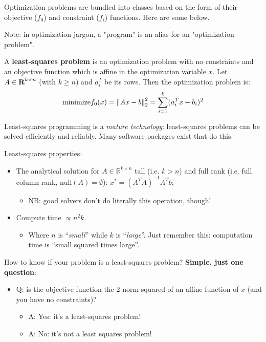 Optimization problems are bundled into classes based on the form of their
objective ($f_0$) and constraint ($f_i$) functions. Here are some below.

\begin{Fact}
  Note: in optimization jargon, a "program" is an alias for an "optimization
  problem".
\end{Fact}


\begin{Definition}
  A \textbf{least-squares problem} is an optimization problem with no
  constraints and an objective function which is affine in the optimization
  variable $x$. Let $A\in\textbf{R}^{k\times n}$ (with $k\ge n$) and $a_i^T$ be its
  rows. Then the optimization problem is:
  \begin{equation*}
    \text{minimize} f_0(x) = \left\|Ax-b\right\|_{2}^2 = \sum_{i=1}^k (a_i^Tx-b_i)^2
  \end{equation*}
\end{Definition}

Least-squares programming is a \textit{mature technology}: least-squares
problems can be solved efficiently and reliably. Many software packages exist
that do this.

\begin{Fact}
  Least-squares properties:
  \begin{itemize}
  \item The analytical solution for $A\in\mathbb R^{k\times n}$ tall
    (i.e. $k>n$) and full rank (i.e. full column rank,
    $\text{null}(A)=\emptyset$): $x^*=(A^TA)^{-1}A^Tb$;
    \begin{itemize}
    \item NB: good solvers don't do literally this operation, though!
    \end{itemize}
  \item Compute time $\propto n^2k$.
    \begin{itemize}
    \item Where $n$ is ``\textit{small}'' while $k$ is ``\textit{large}''. Just
      remember this: computation time is ``small squared times large''.
    \end{itemize}
  \end{itemize}
\end{Fact}

How to know if your problem is a least-squares problem? \textbf{Simple, just one
  question}:

\begin{itemize}
\item Q: is the objective function the 2-norm squared of an affine function of
  $x$ (and you have no constraints)?
  \begin{itemize}
  \item A: Yes: it's a least-squares problem!
  \item A: No: it's not a least squares problem!
  \end{itemize}
\end{itemize}

